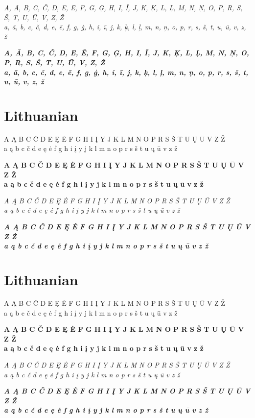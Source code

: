 \documentclass[12pt]{article}
\begin{document}
\textit{
A, Ā, B, C, Č, D, E, Ē, F, G, Ģ, H, I, Ī, J, K, Ķ, L, Ļ, M, N, Ņ, O, P, R, S, Š, T, U, Ū, V, Z, Ž \\
a, ā, b, c, č, d, e, ē, f, g, ģ, h, i, ī, j, k, ķ, l, ļ, m, n, ņ, o, p, r, s, š, t, u, ū, v, z, ž
}

\textbf{\textit{
A, Ā, B, C, Č, D, E, Ē, F, G, Ģ, H, I, Ī, J, K, Ķ, L, Ļ, M, N, Ņ, O, P, R, S, Š, T, U, Ū, V, Z, Ž \\
a, ā, b, c, č, d, e, ē, f, g, ģ, h, i, ī, j, k, ķ, l, ļ, m, n, ņ, o, p, r, s, š, t, u, ū, v, z, ž
}}


\section{Lithuanian}
A Ą B C Č D E Ę Ė F G H I Į Y J K L M N O P R S Š T U Ų Ū V Z Ž \\
a ą b c č d e ę ė f g h i į y j k l m n o p r s š t u ų ū v z ž

\textbf{
A Ą B C Č D E Ę Ė F G H I Į Y J K L M N O P R S Š T U Ų Ū V Z Ž \\
a ą b c č d e ę ė f g h i į y j k l m n o p r s š t u ų ū v z ž
}

\textit{
A Ą B C Č D E Ę Ė F G H I Į Y J K L M N O P R S Š T U Ų Ū V Z Ž \\
a ą b c č d e ę ė f g h i į y j k l m n o p r s š t u ų ū v z ž
}

\textbf{\textit{
A Ą B C Č D E Ę Ė F G H I Į Y J K L M N O P R S Š T U Ų Ū V Z Ž \\
a ą b c č d e ę ė f g h i į y j k l m n o p r s š t u ų ū v z ž
}}


\clearpage
\section{Lithuanian}
A Ą B C Č D E Ę Ė F G H I Į Y J K L M N O P R S Š T U Ų Ū V Z Ž \\
a ą b c č d e ę ė f g h i į y j k l m n o p r s š t u ų ū v z ž

\textbf{
A Ą B C Č D E Ę Ė F G H I Į Y J K L M N O P R S Š T U Ų Ū V Z Ž \\
a ą b c č d e ę ė f g h i į y j k l m n o p r s š t u ų ū v z ž
}

\textit{
A Ą B C Č D E Ę Ė F G H I Į Y J K L M N O P R S Š T U Ų Ū V Z Ž \\
a ą b c č d e ę ė f g h i į y j k l m n o p r s š t u ų ū v z ž
}

\textbf{\textit{
A Ą B C Č D E Ę Ė F G H I Į Y J K L M N O P R S Š T U Ų Ū V Z Ž \\
a ą b c č d e ę ė f g h i į y j k l m n o p r s š t u ų ū v z ž
}}
\end{document}
